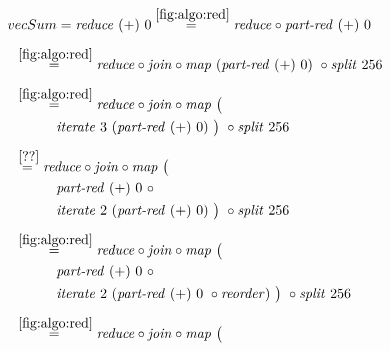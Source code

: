 \begin{figure*}[t]
\begin{align*}
  &\hspace{-1.5em}vecSum = \reduce\ (+)\ 0
%
  \overset{\ref{fig:algo:red}}{=\hspace{.2em}}
      \reduce \circ \partRed\ (+)\ 0\\[.5em]
%
  &\hspace{-2em}\quad\begin{aligned}
    &\overset{\ref{fig:algo:red}}{=\hspace{.2em}}
      \reduce \circ \join \circ \map\ (\partRed\ (+)\ 0)\ \circ \splitN\ 256
  \end{aligned}\\[.5em]
%
  &\hspace{-2em}\quad\begin{aligned}
    &\overset{\ref{fig:algo:red}}{=\hspace{.2em}}
      \reduce \circ \join \circ \map\ \big(\\
    &\qquad\quad\iterateN\ 3\ (\partRed\ (+)\ 0)\ \big)\ \circ \splitN\ 256
  \end{aligned}\\[.5em]
%
  &\hspace{-2em}\quad\begin{aligned}
    &\overset{\ref{??}}{=\hspace{.2em}}
      \reduce \circ \join \circ \map\ \big(\\
    &\qquad\quad\partRed\ (+)\ 0\ \circ\\
    &\qquad\quad\iterateN\ 2\ (\partRed\ (+)\ 0)\ \big)\ \circ \splitN\ 256
  \end{aligned}\\[.5em]
%
  &\hspace{-2em}\quad\begin{aligned}
    &\overset{\ref{fig:algo:red}}{=\hspace{.2em}}
      \reduce \circ \join \circ \map\ \big(\\
    &\qquad\quad\partRed\ (+)\ 0\ \circ\\
    &\qquad\quad\iterateN\ 2\ (\partRed\ (+)\ 0\ \circ \reorder)\ \big)\ \circ \splitN\ 256
  \end{aligned}\\[.5em]
%
  &\hspace{-2em}\quad\begin{aligned}
    &\overset{\ref{fig:algo:red}}{=\hspace{.2em}}
      \reduce \circ \join \circ \map\ \big(\\

\end{aligned}
\end{align*}
\end{figure*}
